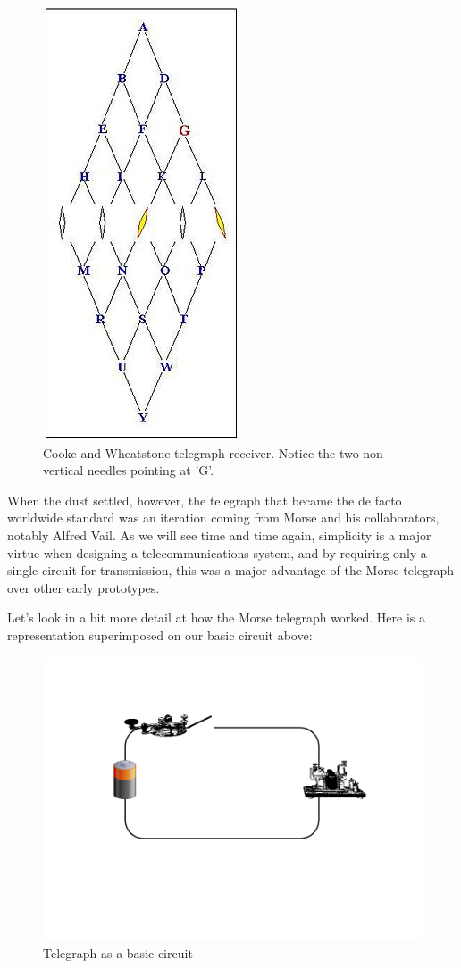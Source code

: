 \documentclass[UTF8]{book}
\begin{document}
\begin{CJK}{UTF8}{gbsn}
\begin{figure}[H]
\centering
\includegraphics[width=0.4\linewidth]{wheatstone}
\caption{Cooke and Wheatstone telegraph receiver. Notice the two non-vertical needles pointing at 'G'.}
\end{figure}

When the dust settled, however, the telegraph that became the de facto worldwide standard was an iteration coming from Morse and his collaborators, notably Alfred Vail. As we will see time and time again, simplicity is a major virtue when designing a telecommunications system, and by requiring only a single circuit for transmission, this was a major advantage of the Morse telegraph over other early prototypes.

Let's look in a bit more detail at how the Morse telegraph worked. Here is a representation superimposed on our basic circuit above:

\begin{figure}[H]
\centering
\includegraphics[width=0.8\linewidth]{telegraph_as_circuit}
\caption{Telegraph as a basic circuit}
\end{figure}


\end{CJK}
\end{document}
